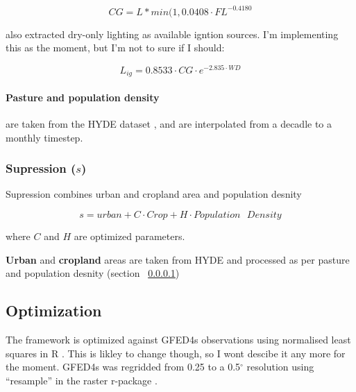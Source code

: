 \begin{equation}
    CG = L * min(1, 0.0408 \cdot FL^{-0.4180}
\end{equation}

\begin{shaded}
\citet{kelley2014improved} also extracted dry-only lighting as available igntion sources. I'm implementing this as the moment, but I'm not to sure if I should:

\begin{equation}
    L_{ig} = 0.8533 \cdot CG \cdot e^{-2.835 \cdot WD}
\end{equation}
\end{shaded}

\paragraph{Pasture and population density}
\label{Pasture}
are taken from the HYDE dataset \citep{klein2007mapping}, and are interpolated from a decadle to a monthly timestep.

\subsubsection{Supression ($s$)}

Supression combines urban and cropland area and population desnity

\begin{equation}
    s = urban + C \cdot Crop + H \cdot Population\text{ }Density
    \label{equ:Supression}
\end{equation}

where $C$ and $H$ are optimized parameters.

\textbf{Urban} and \textbf{cropland} areas are taken from HYDE and processed as per pasture and population desnity (section ~\ref{Pasture})


\subsection{Optimization}

\begin{shaded}
The framework is optimized against GFED4s observations \citep{Giglio2013}  using normalised least squares in R \citep{rstats}.  This is likley to change though, so I wont descibe it any more for the moment. GFED4s was regridded from 0.25 to a 0.5$^{\circ}$ resolution using ``resample'' in the raster r-package \citep{rraster}.
\end{shaded}

